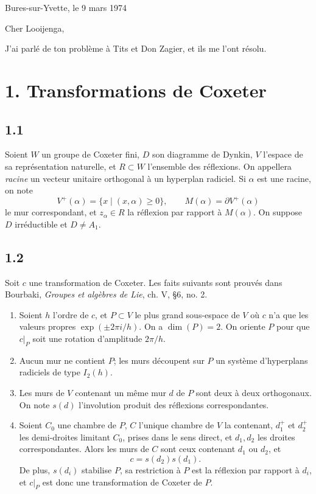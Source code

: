 \documentclass[11pt]{article}
\theoremstyle{plainfr}
\begin{document}
\begin{flushright}
Bures-sur-Yvette, le 9 mars 1974
\end{flushright}

Cher Looijenga,

J'ai parlé de ton problème à Tits et Don Zagier, et ils me l'ont résolu.

\section*{1. Transformations de Coxeter}

\subsection*{1.1}
Soient $W$ un groupe de Coxeter fini, $D$ son diagramme de Dynkin, $V$ l'espace de sa représentation naturelle, et $R\subset W$ l'ensemble des réflexions. On appellera \emph{racine} un vecteur unitaire orthogonal à un hyperplan radiciel. Si $\alpha$ est une racine, on note
\[
 V^+(\alpha)=\{x\mid (x,\alpha)\geq 0\},\qquad M(\alpha)=\partial V^+(\alpha)
\]
le mur correspondant, et $z_\alpha\in R$ la réflexion par rapport à $M(\alpha)$. On suppose $D$ irréductible et $D\ne A_1$.

\subsection*{1.2}
Soit $c$ une transformation de Coxeter. Les faits suivants sont prouvés dans Bourbaki, \emph{Groupes et algèbres de Lie}, ch. V, §6, no. 2.

\begin{enumerate}[label=(\roman*),leftmargin=2.2em]
\item Soient $h$ l'ordre de $c$, et $P\subset V$ le plus grand sous-espace de $V$ où $c$ n'a que les valeurs propres $\exp(\pm 2\pi i/h)$. On a $\dim(P)=2$. On oriente $P$ pour que $c\vert_P$ soit une rotation d'amplitude $2\pi/h$.

\item Aucun mur ne contient $P$; les murs découpent sur $P$ un système d'hyperplans radiciels de type $I_2(h)$.

\item Les murs de $V$ contenant un même mur $d$ de $P$ sont deux à deux orthogonaux. On note $s(d)$ l'involution produit des réflexions correspondantes.

\item Soient $C_0$ une chambre de $P$, $C$ l'unique chambre de $V$ la contenant, $d_1^+$ et $d_2^+$ les demi-droites limitant $C_0$, prises dans le sens direct, et $d_1,d_2$ les droites correspondantes. Alors les murs de $C$ sont ceux contenant $d_1$ ou $d_2$, et
\[
 c=s(d_2)s(d_1).
\]
De plus, $s(d_i)$ stabilise $P$, sa restriction à $P$ est la réflexion par rapport à $d_i$, et $c\vert_P$ est donc une transformation de Coxeter de $P$.
\end{enumerate}
\end{document}
